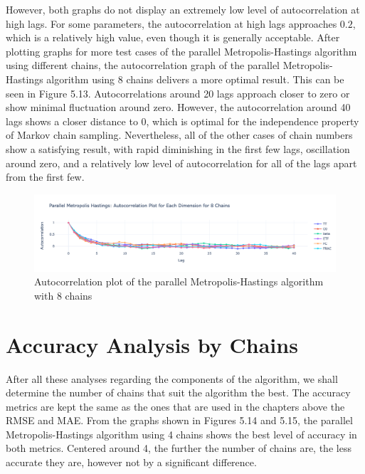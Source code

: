 However, both graphs do not display an extremely low level of autocorrelation at high lags. For some parameters, the autocorrelation at high lags approaches $0.2$, which is a relatively high value, even though it is generally acceptable. After plotting graphs for more test cases of the parallel Metropolis-Hastings algorithm using different chains, the autocorrelation graph of the parallel Metropolis-Hastings algorithm using 8 chains delivers a more optimal result. This can be seen in Figure 5.13. Autocorrelations around 20 lags approach closer to zero or show minimal fluctuation around zero. However, the autocorrelation around 40 lags shows a closer distance to 0, which is optimal for the independence property of Markov chain sampling. Nevertheless, all of the other cases of chain numbers show a satisfying result, with rapid diminishing in the first few lags, oscillation around zero, and a relatively low level of autocorrelation for all of the lags apart from the first few.


\begin{figure}[H]
    \centering
    \includegraphics[width=1\textwidth]{figures/parallel_mh/Autocorrelation_8.png}
    \captionsetup{width=.8\textwidth}
    \caption{Autocorrelation plot of the parallel Metropolis-Hastings algorithm with 8 chains}
    \label{fig:enter-label}
\end{figure}


\section{Accuracy Analysis by Chains}
After all these analyses regarding the components of the algorithm, we shall determine the number of chains that suit the algorithm the best. The accuracy metrics are kept the same as the ones that are used in the chapters above the RMSE and MAE. From the graphs shown in Figures 5.14 and 5.15, the parallel Metropolis-Hastings algorithm using 4 chains shows the best level of accuracy in both metrics. Centered around 4, the further the number of chains are, the less accurate they are, however not by a significant difference.

